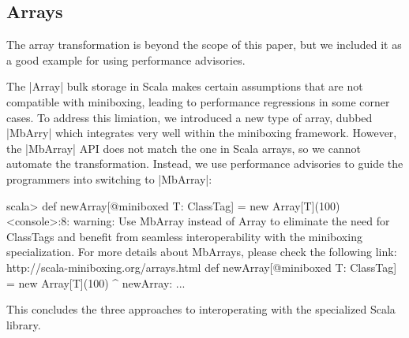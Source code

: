 \subsection{Arrays}
\label{sec:mbarrays}

The array transformation \cite{romain-mbarrays} is beyond the scope of this paper, but we included it as a good example for using performance advisories.

The |Array| bulk storage in Scala makes certain assumptions that are not compatible with miniboxing, leading to performance regressions in some corner cases. To address this limiation, we introduced a new type of array, dubbed |MbArry| which integrates very well within the miniboxing framework. However, the |MbArray| API does not match the one in Scala arrays, so we cannot automate the transformation. Instead, we use performance advisories to guide the programmers into switching to |MbArray|:

\begin{lstlisting-nobreak-nolang}
scala> def newArray[@miniboxed T: ClassTag] = new Array[T](100)
<console>:8: warning: Use MbArray instead of Array to eliminate the need for ClassTags and benefit from seamless interoperability with the miniboxing specialization. For more details about MbArrays, please check the following link: http://scala-miniboxing.org/arrays.html
       def newArray[@miniboxed T: ClassTag] = new Array[T](100)
                                              ^
newArray: ...
\end{lstlisting-nobreak-nolang}

This concludes the three approaches to interoperating with the specialized Scala library.

